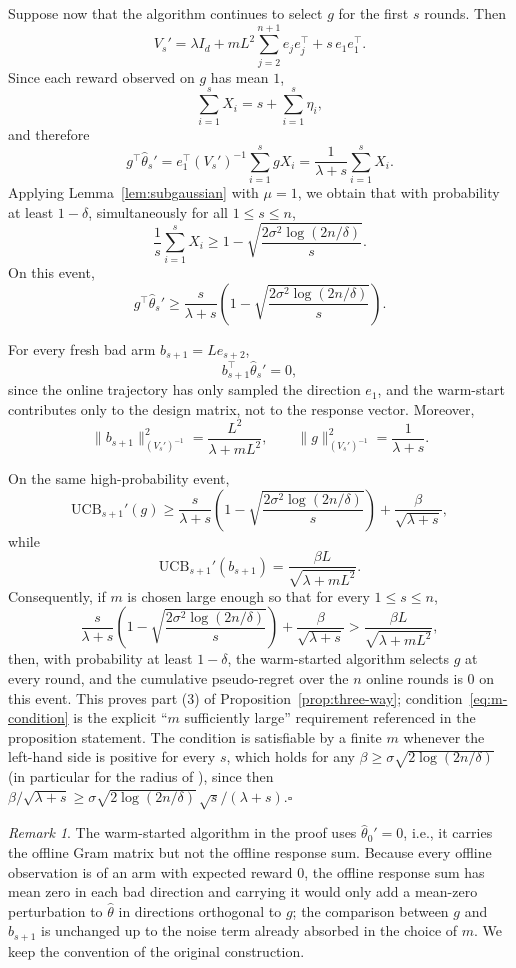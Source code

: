 \documentclass{article}
\theoremstyle{definition}
\theoremstyle{remark}
\newtheorem{remark}{Remark}
\theoremstyle{remark}
\begin{document}
Suppose now that the algorithm continues to select $g$ for the first $s$ rounds. Then
\[
V_s'
=
\lambda I_d
+
mL^2 \sum_{j=2}^{n+1} e_j e_j^\top
+
s\, e_1 e_1^\top.
\]
Since each reward observed on $g$ has mean $1$,
\[
\sum_{i=1}^s X_i = s + \sum_{i=1}^s \eta_i,
\]
and therefore
\[
g^\top \hat{\theta}_s'
=
e_1^\top (V_s')^{-1}\sum_{i=1}^s g X_i
=
\frac{1}{\lambda+s}\sum_{i=1}^s X_i.
\]
Applying Lemma~\ref{lem:subgaussian} with $\mu=1$, we obtain that with probability at least $1-\delta$, simultaneously for all $1\le s\le n$,
\[
\frac{1}{s}\sum_{i=1}^s X_i
\ge
1-\sqrt{\frac{2\sigma^2\log(2n/\delta)}{s}}.
\]
On this event,
\[
g^\top \hat{\theta}_s'
\ge
\frac{s}{\lambda+s}
\left(
1-\sqrt{\frac{2\sigma^2\log(2n/\delta)}{s}}
\right).
\]

For every fresh bad arm $b_{s+1}=Le_{s+2}$,
\[
b_{s+1}^\top \hat{\theta}_s' = 0,
\]
since the online trajectory has only sampled the direction $e_1$, and the warm-start contributes only to the design matrix, not to the response vector. Moreover,
\[
\|b_{s+1}\|_{(V_s')^{-1}}^2
=
\frac{L^2}{\lambda+mL^2},
\qquad
\|g\|_{(V_s')^{-1}}^2
=
\frac{1}{\lambda+s}.
\]

On the same high-probability event,
\[
\mathrm{UCB}_{s+1}'(g)
\ge
\frac{s}{\lambda+s}
\left(
1-\sqrt{\frac{2\sigma^2\log(2n/\delta)}{s}}
\right)
+
\frac{\beta}{\sqrt{\lambda+s}},
\]
while
\[
\mathrm{UCB}_{s+1}'(b_{s+1})
=
\frac{\beta L}{\sqrt{\lambda+mL^2}}.
\]
Consequently, if $m$ is chosen large enough so that for every $1\le s\le n$,
\begin{equation}
\label{eq:m-condition}
\frac{s}{\lambda+s}
\left(
1-\sqrt{\frac{2\sigma^2\log(2n/\delta)}{s}}
\right)
+
\frac{\beta}{\sqrt{\lambda+s}}
>
\frac{\beta L}{\sqrt{\lambda+mL^2}},
\end{equation}
then, with probability at least $1-\delta$, the warm-started algorithm selects $g$ at every round, and the cumulative pseudo-regret over the $n$ online rounds is $0$ on this event. This proves part (3) of Proposition~\ref{prop:three-way}; condition~\eqref{eq:m-condition} is the explicit ``$m$ sufficiently large'' requirement referenced in the proposition statement. The condition is satisfiable by a finite $m$ whenever the left-hand side is positive for every $s$, which holds for any $\beta\ge\sigma\sqrt{2\log(2n/\delta)}$ (in particular for the radius of \cite{abbasi2011improved}), since then $\beta/\sqrt{\lambda+s}\ge\sigma\sqrt{2\log(2n/\delta)}\,\sqrt s/(\lambda+s)$.\hfill$\square$


\begin{remark}
The warm-started algorithm in the proof uses $\widehat\theta_0'=0$, i.e., it
carries the offline Gram matrix but not the offline response sum. Because
every offline observation is of an arm with expected reward $0$, the offline
response sum has mean zero in each bad direction and carrying it would only
add a mean-zero perturbation to $\widehat\theta$ in directions orthogonal to
$g$; the comparison between $g$ and $b_{s+1}$ is unchanged up to the noise
term already absorbed in the choice of $m$. We keep the convention of the
original construction.
\end{remark}
\end{document}
